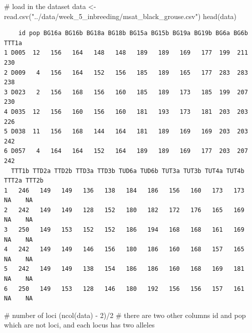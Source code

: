\documentclass[
  letterpaper,
  DIV=11,
  numbers=noendperiod]{scrreprt}
\newenvironment{Shaded}{}{}
\newcommand{\CommentTok}[1]{\textcolor[rgb]{0.42,0.45,0.49}{#1}}
\newcommand{\DecValTok}[1]{\textcolor[rgb]{0.00,0.36,0.77}{#1}}
\newcommand{\FunctionTok}[1]{\textcolor[rgb]{0.44,0.26,0.76}{#1}}
\newcommand{\NormalTok}[1]{\textcolor[rgb]{0.14,0.16,0.18}{#1}}
\newcommand{\OtherTok}[1]{\textcolor[rgb]{0.44,0.26,0.76}{#1}}
\newcommand{\SpecialCharTok}[1]{\textcolor[rgb]{0.00,0.36,0.77}{#1}}
\newcommand{\StringTok}[1]{\textcolor[rgb]{0.01,0.18,0.38}{#1}}
\begin{document}
\begin{tcolorbox}[enhanced jigsaw, arc=.35mm, left=2mm, titlerule=0mm, rightrule=.15mm, colframe=quarto-callout-tip-color-frame, coltitle=black, colback=white, opacityback=0, bottomtitle=1mm, bottomrule=.15mm, colbacktitle=quarto-callout-tip-color!10!white, breakable, title=\textcolor{quarto-callout-tip-color}{\faLightbulb}\hspace{0.5em}{Code and answer}, toptitle=1mm, toprule=.15mm, opacitybacktitle=0.6, leftrule=.75mm]

\begin{Shaded}
\begin{Highlighting}[]
\CommentTok{\# load in the dataset}
\NormalTok{data }\OtherTok{\textless{}{-}} \FunctionTok{read.csv}\NormalTok{(}\StringTok{"../data/week\_5\_inbreeding/msat\_black\_grouse.csv"}\NormalTok{)}
\FunctionTok{head}\NormalTok{(data)}
\end{Highlighting}
\end{Shaded}

\begin{verbatim}
    id pop BG16a BG16b BG18a BG18b BG15a BG15b BG19a BG19b BG6a BG6b TTT1a
1 D005  12   156   164   148   148   189   189   169   177  199  211   230
2 D009   4   156   164   152   156   185   189   165   177  283  283   238
3 D023   2   156   168   156   160   185   189   173   185  199  207   230
4 D035  12   156   160   156   160   181   193   173   181  203  203   226
5 D038  11   156   168   144   164   181   189   169   169  203  203   242
6 D057   4   164   164   152   164   189   189   169   177  203  207   242
  TTT1b TTD2a TTD2b TTD3a TTD3b TUD6a TUD6b TUT3a TUT3b TUT4a TUT4b TTT2a TTT2b
1   246   149   149   136   138   184   186   156   160   173   173    NA    NA
2   242   149   149   128   152   180   182   172   176   165   169    NA    NA
3   250   149   153   152   152   186   194   168   168   161   169    NA    NA
4   242   149   149   146   156   180   186   160   168   157   165    NA    NA
5   242   149   149   138   154   186   186   160   168   169   181    NA    NA
6   250   149   153   128   146   180   192   156   156   157   161    NA    NA
\end{verbatim}

\begin{Shaded}
\begin{Highlighting}[]
\CommentTok{\# number of loci}
\NormalTok{(}\FunctionTok{ncol}\NormalTok{(data) }\SpecialCharTok{{-}} \DecValTok{2}\NormalTok{)}\SpecialCharTok{/}\DecValTok{2} \CommentTok{\# there are two other columns \textquotesingle{}id\textquotesingle{} and \textquotesingle{}pop\textquotesingle{} which are not loci, and each locus has two alleles}
\end{Highlighting}
\end{Shaded}


\end{tcolorbox}
\end{document}
